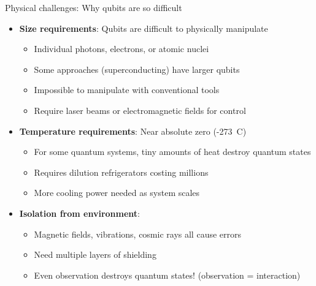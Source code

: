 \documentclass[aspectratio=169, lualatex]{beamer} %
\def\enrouge#1{\textcolor{rouge}{#1}}
\begin{document}
\begin{frame}{Physical challenges: Why qubits are so difficult}
	\begin{itemize}
		\item \textbf{Size requirements}: Qubits are difficult to physically manipulate
		      \begin{itemize}
			      \item Individual photons, electrons, or atomic nuclei
			      \item Some approaches (superconducting) have larger qubits
			      \item Impossible to manipulate with conventional tools
			      \item Require laser beams or electromagnetic fields for control
		      \end{itemize}
		\item \textbf{Temperature requirements}: Near absolute zero (-273\degree\ C)
		      \begin{itemize}
			      \item For some quantum systems, tiny amounts of heat destroy quantum states
			      \item Requires dilution refrigerators costing millions
			      \item More cooling power needed as system scales
		      \end{itemize}
		\item \textbf{Isolation from environment}:
		      \begin{itemize}
			      \item Magnetic fields, vibrations, cosmic rays all cause errors
			      \item Need multiple layers of shielding
			      \item Even observation destroys quantum states! \enrouge{(observation = interaction)}
		      \end{itemize}
	\end{itemize}
\end{frame}
\end{document}
